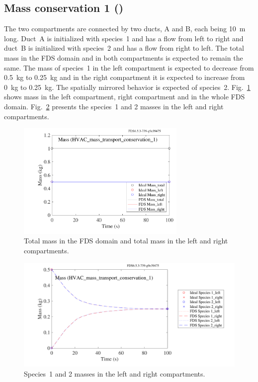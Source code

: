 \documentclass[11pt]{book}
\begin{document}
\subsection{Mass conservation 1 (\texorpdfstring{}{HVAC\_mass\_transport\_conservation\_1})}
\label{HVAC_mass_transport_conservation_1}
The two compartments are connected by two ducts, A and B, each being \SI{10}{\meter} long. Duct~A is initialized with species~1 and has a flow from left to right and duct~B is initialized with species~2 and has a flow from right to left. The total mass in the FDS domain and in both compartments is expected to remain the same. The mass of species~1 in the left compartment is expected to decrease from \SI{0.5}{\kilogram} to \SI{0.25}{\kilogram} and in the right compartment it is expected to increase from \SI{0}{\kilogram} to \SI{0.25}{\kilogram}. The spatially mirrored behavior is expected of species~2. Fig.~\ref{fig_HVAC_mass_transport_conservation_1a} shows mass in the left compartment, right compartment and in the whole FDS domain. Fig.~\ref{fig_HVAC_mass_transport_conservation_1b} presents the species~1 and 2 masses in the left and right compartments.

\begin{figure}[ht]
\centering
\includegraphics[width=3.2in]{SCRIPT_FIGURES/HVAC_mass_transport_conservation_1a}
\caption[ test case.]{Total mass in the FDS domain and total mass in the left and right compartments.}
\label{fig_HVAC_mass_transport_conservation_1a}
\end{figure}

\begin{figure}[ht]
\centering
\includegraphics[width=4.48in]{SCRIPT_FIGURES/HVAC_mass_transport_conservation_1b}
\caption[ test case.]{Species~1 and 2 masses in the left and right compartments.}
\label{fig_HVAC_mass_transport_conservation_1b}
\end{figure}
\end{document}
